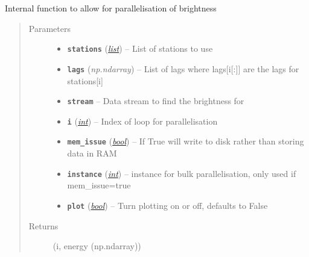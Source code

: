 \documentclass[a4paper,10pt,english]{sphinxmanual}
\begin{document}

\begin{fulllineitems}
\label{core:bright_lights._node_loop}
Internal function to allow for parallelisation of brightness
\begin{quote}\begin{description}
\item[{Parameters}] \leavevmode\begin{itemize}
\item {} 
\textbf{\texttt{stations}} (\href{https://docs.python.org/library/functions.html\#list}{\emph{list}}) -- List of stations to use

\item {} 
\textbf{\texttt{lags}} (\emph{np.ndarray}) -- List of lags where lags{[}i{[}:{]}{]} are the lags for stations{[}i{]}

\item {} 
\textbf{\texttt{stream}} -- Data stream to find the brightness for

\item {} 
\textbf{\texttt{i}} (\href{https://docs.python.org/library/functions.html\#int}{\emph{int}}) -- Index of loop for parallelisation

\item {} 
\textbf{\texttt{mem\_issue}} (\href{https://docs.python.org/library/functions.html\#bool}{\emph{bool}}) -- If True will write to disk rather than storing data in RAM

\item {} 
\textbf{\texttt{instance}} (\href{https://docs.python.org/library/functions.html\#int}{\emph{int}}) -- instance for bulk parallelisation, only used if mem\_issue=true

\item {} 
\textbf{\texttt{plot}} (\href{https://docs.python.org/library/functions.html\#bool}{\emph{bool}}) -- Turn plotting on or off, defaults to False

\end{itemize}

\item[{Returns}] \leavevmode
(i, energy (np.ndarray))

\end{description}\end{quote}

\end{fulllineitems}
\end{document}
